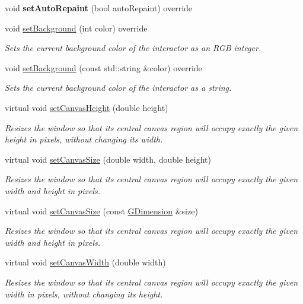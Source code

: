 \begin{DoxyCompactItemize}
void {\bfseries set\+Auto\+Repaint} (bool auto\+Repaint) override
\item 
void \mbox{\hyperlink{classGWindow_a10d305826534b55561ea88730fc9f6cd}{set\+Background}} (int color) override
\begin{DoxyCompactList}\small\item\em Sets the current background color of the interactor as an R\+GB integer. \end{DoxyCompactList}\item 
void \mbox{\hyperlink{classGWindow_a9cb99695b93494c7ba28268ce9e42c2a}{set\+Background}} (const std\+::string \&color) override
\begin{DoxyCompactList}\small\item\em Sets the current background color of the interactor as a string. \end{DoxyCompactList}\item 
virtual void \mbox{\hyperlink{classGWindow_a059f69fab57ad2cca2243c5a64f7306d}{set\+Canvas\+Height}} (double height)
\begin{DoxyCompactList}\small\item\em Resizes the window so that its central canvas region will occupy exactly the given height in pixels, without changing its width. \end{DoxyCompactList}\item 
virtual void \mbox{\hyperlink{classGWindow_a06022723e253be88ca7e48034ff66244}{set\+Canvas\+Size}} (double width, double height)
\begin{DoxyCompactList}\small\item\em Resizes the window so that its central canvas region will occupy exactly the given width and height in pixels. \end{DoxyCompactList}\item 
virtual void \mbox{\hyperlink{classGWindow_a22f0f065a223a3c0ae5173316ece1dc1}{set\+Canvas\+Size}} (const \mbox{\hyperlink{structGDimension}{G\+Dimension}} \&size)
\begin{DoxyCompactList}\small\item\em Resizes the window so that its central canvas region will occupy exactly the given width and height in pixels. \end{DoxyCompactList}\item 
virtual void \mbox{\hyperlink{classGWindow_a455beafcfc20a2b7d9ac00499e222f0f}{set\+Canvas\+Width}} (double width)
\begin{DoxyCompactList}\small\item\em Resizes the window so that its central canvas region will occupy exactly the given width in pixels, without changing its height. \end{DoxyCompactList}\item 

\end{DoxyCompactItemize}
